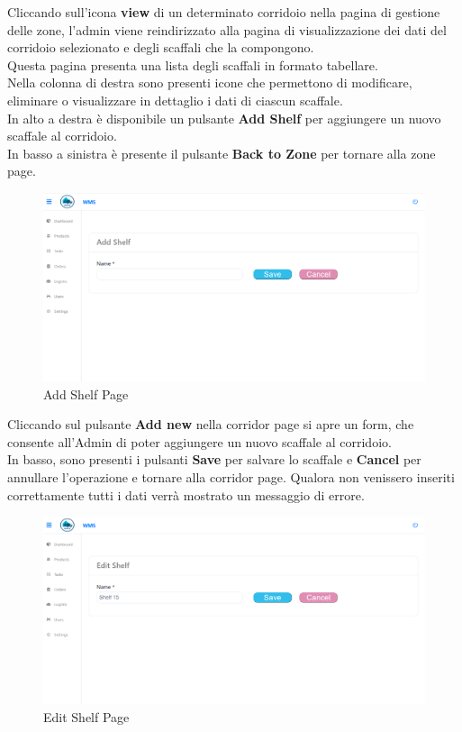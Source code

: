 Cliccando sull'icona \textbf{view} di un determinato corridoio nella pagina di gestione delle zone,
l’admin viene reindirizzato alla pagina di visualizzazione dei dati del corridoio selezionato e degli scaffali che la compongono.\\
Questa pagina presenta una lista degli scaffali in formato tabellare.\\
Nella colonna di destra sono presenti icone che permettono di modificare, eliminare o visualizzare in dettaglio i dati di ciascun scaffale.\\
In alto a destra è disponibile un pulsante \textbf{Add Shelf} per aggiungere un nuovo scaffale al corridoio.\\
In basso a sinistra è presente il pulsante \textbf{Back to Zone} per tornare alla zone page.

\begin{figure}[H]
    \centering
    \includegraphics[width=\textwidth]{document/sections/img/Storyboard/addShelfPage.png}
    \caption{Add Shelf Page}
    \label{fig:addShelfPages}
\end{figure}

Cliccando sul pulsante \textbf{Add new} nella corridor page si apre un form, che consente
all'Admin di poter aggiungere un nuovo scaffale al corridoio.\\
In basso, sono presenti i pulsanti \textbf{Save} per salvare lo scaffale e \textbf{Cancel} per annullare l'operazione
e tornare alla corridor page.
Qualora non venissero inseriti correttamente tutti i dati verrà mostrato un messaggio di errore.

\begin{figure}[H]
    \centering
    \includegraphics[width=\textwidth]{document/sections/img/Storyboard/editShelfPage.png}
    \caption{Edit Shelf Page}
    \label{fig:editShelfPage}
\end{figure}

